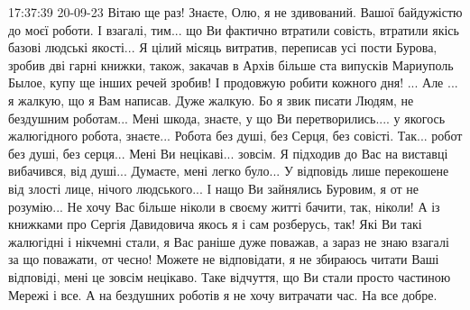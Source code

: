  
 
 
 
 

17:37:39 20-09-23
Вітаю ще раз! Знаєте, Олю, я не здивований. Вашої байдужістю до моєї роботи. І взагалі, тим... що Ви фактично втратили совість,
втратили якісь базові людські якості...	 Я цілий місяць витратив, переписав
усі пости Бурова, зробив дві гарні книжки, також, закачав в Архів більше ста випусків Мариуполь Былое, купу ще інших речей зробив!
І продовжую робити кожного дня! ... Але ... я жалкую, що я Вам написав. Дуже жалкую. Бо я звик писати Людям,
не бездушним роботам...
Мені шкода, знаєте, у що Ви перетворились.... у якогось жалюгідного робота, знаєте...
Робота без душі, без Серця, без совісті. Так... робот без душі, без серця... Мені Ви нецікаві... зовсім. Я підходив до Вас на виставці
вибачився, від душі... Думаєте, мені легко було...  У відповідь лише перекошене від злості лице, нічого людського...
І нащо Ви зайнялись Буровим, я от не розумію... Не хочу Вас більше ніколи в своєму житті бачити, так, ніколи!
А із книжками про Сергія Давидовича якось я і сам розберусь, так!
Які Ви такі жалюгідні і нікчемні стали, я Вас раніше дуже поважав, а зараз не знаю взагалі за що поважати, от чесно!
Можете не відповідати, я не збираюсь читати Ваші відповіді, мені це зовсім нецікаво.
Таке відчуття, що Ви стали просто частиною Мережі і все.
А на бездушних роботів я не хочу витрачати час.
На все добре.

